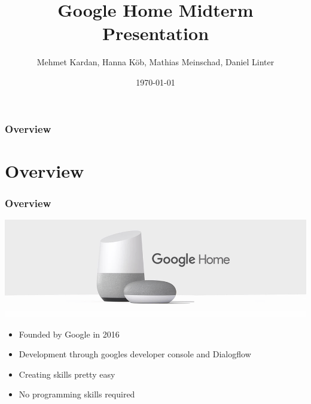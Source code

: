 \documentclass{beamer}
\title[Google Home]{Google Home Midterm Presentation} %
\author{Mehmet Kardan, Hanna Köb, Mathias Meinschad, Daniel Linter} %
\institute[UCLA] %
{
University of Innsbruck - SIT \\ %
}
\date{\today} %
\begin{document}
\begin{frame}
\titlepage %
\end{frame}

\begin{frame}
\frametitle{Overview} %
\tableofcontents %
\end{frame}


\section{Overview}

\begin{frame}
\frametitle{Overview}
\begin{center}
\includegraphics[scale=0.35]{pictures/google-home.png} 
\end{center}
\begin{itemize}
\item Founded by Google in 2016
\item Development through googles developer console and Dialogflow
\item Creating skills pretty easy
\item No programming skills required
\end{itemize}
\end{frame}
\end{document}
